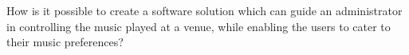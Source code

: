 How is it possible to create a software solution which can guide an administrator in controlling the music played at a venue, while enabling the users to cater to their music preferences?